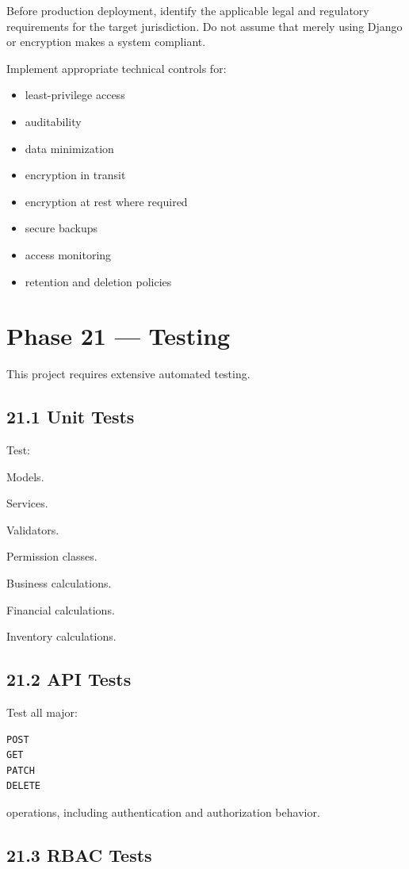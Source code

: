 \documentclass[11pt,a4paper]{article}
\newcommand{\task}[1]{\item[$\square$] #1}
\begin{document}
Before production deployment, identify the applicable legal and regulatory
requirements for the target jurisdiction. Do not assume that merely using
Django or encryption makes a system compliant.

Implement appropriate technical controls for:

\begin{itemize}
    \item least-privilege access
    \item auditability
    \item data minimization
    \item encryption in transit
    \item encryption at rest where required
    \item secure backups
    \item access monitoring
    \item retention and deletion policies
\end{itemize}

\section{Phase 21 --- Testing}

This project requires extensive automated testing.

\subsection{21.1 Unit Tests}

Test:

\task{Models.}
\task{Services.}
\task{Validators.}
\task{Permission classes.}
\task{Business calculations.}
\task{Financial calculations.}
\task{Inventory calculations.}

\subsection{21.2 API Tests}

Test all major:

\begin{lstlisting}
POST
GET
PATCH
DELETE
\end{lstlisting}

operations, including authentication and authorization behavior.

\subsection{21.3 RBAC Tests}
\end{document}
